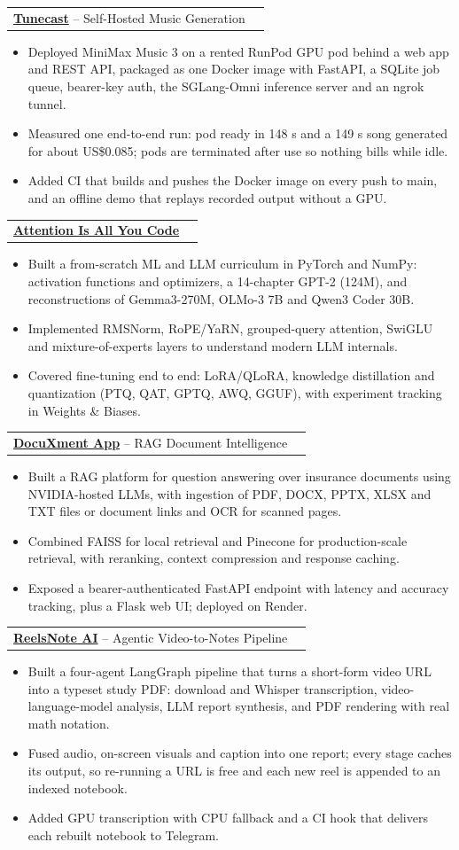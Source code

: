 \documentclass[letterpaper,10.5pt]{article}
\makeatletter
\newcommand{\resumeItem}[1]{
  \item\small{#1 \vspace{-2pt}}
}
\newcommand{\resumeProjectHeading}[2]{
    \vspace{5pt}\item
    \begin{tabular*}{0.97\textwidth}{l@{\extracolsep{\fill}}r}
      \small#1 & #2 \\
    \end{tabular*}
}
\newcommand{\resumeItemListStart}{\begin{itemize}[leftmargin=0.18in, itemsep=0pt, topsep=0pt]}
\newcommand{\resumeItemListEnd}{\end{itemize}\vspace{-5pt}}
\makeatother
\begin{document}
      \resumeProjectHeading
          {\href{https://github.com/ArpitKadam/Tunecast}{\textbf{Tunecast}} -- Self-Hosted Music Generation}{}
          \resumeItemListStart
            \resumeItem{Deployed MiniMax Music 3 on a rented RunPod GPU pod behind a web app and REST API, packaged as one Docker image with FastAPI, a SQLite job queue, bearer-key auth, the SGLang-Omni inference server and an ngrok tunnel.}
            \resumeItem{Measured one end-to-end run: pod ready in 148 s and a 149 s song generated for about US\$0.085; pods are terminated after use so nothing bills while idle.}
            \resumeItem{Added CI that builds and pushes the Docker image on every push to main, and an offline demo that replays recorded output without a GPU.}
          \resumeItemListEnd

      \resumeProjectHeading
          {\href{https://github.com/ArpitKadam/Attention-Is-All-You-Code}{\textbf{Attention Is All You Code}}}{}
          \resumeItemListStart
            \resumeItem{Built a from-scratch ML and LLM curriculum in PyTorch and NumPy: activation functions and optimizers, a 14-chapter GPT-2 (124M), and reconstructions of Gemma3-270M, OLMo-3 7B and Qwen3 Coder 30B.}
            \resumeItem{Implemented RMSNorm, RoPE/YaRN, grouped-query attention, SwiGLU and mixture-of-experts layers to understand modern LLM internals.}
            \resumeItem{Covered fine-tuning end to end: LoRA/QLoRA, knowledge distillation and quantization (PTQ, QAT, GPTQ, AWQ, GGUF), with experiment tracking in Weights \& Biases.}
          \resumeItemListEnd

      \resumeProjectHeading
          {\href{https://github.com/ArpitKadam/DocuXment-App}{\textbf{DocuXment App}} -- RAG Document Intelligence}{}
          \resumeItemListStart
            \resumeItem{Built a RAG platform for question answering over insurance documents using NVIDIA-hosted LLMs, with ingestion of PDF, DOCX, PPTX, XLSX and TXT files or document links and OCR for scanned pages.}
            \resumeItem{Combined FAISS for local retrieval and Pinecone for production-scale retrieval, with reranking, context compression and response caching.}
            \resumeItem{Exposed a bearer-authenticated FastAPI endpoint with latency and accuracy tracking, plus a Flask web UI; deployed on Render.}
          \resumeItemListEnd

      \resumeProjectHeading
          {\href{https://github.com/ArpitKadam/ReelsNote.ai}{\textbf{ReelsNote AI}} -- Agentic Video-to-Notes Pipeline}{}
          \resumeItemListStart
            \resumeItem{Built a four-agent LangGraph pipeline that turns a short-form video URL into a typeset study PDF: download and Whisper transcription, video-language-model analysis, LLM report synthesis, and PDF rendering with real math notation.}
            \resumeItem{Fused audio, on-screen visuals and caption into one report; every stage caches its output, so re-running a URL is free and each new reel is appended to an indexed notebook.}
            \resumeItem{Added GPU transcription with CPU fallback and a CI hook that delivers each rebuilt notebook to Telegram.}
          \resumeItemListEnd
\end{document}
